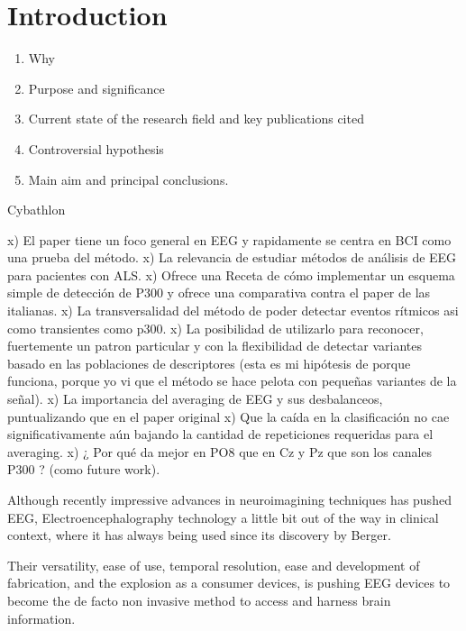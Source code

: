 \documentclass[entropy,article,submit,moreauthors,pdftex,10pt,a4paper]{mdpi}
\begin{document}

\setcounter{section}{-1} %

\section{Introduction}

\begin{enumerate}[leftmargin=*,labelsep=3mm]
\item	Why
\item	Purpose and significance
\item	Current state of the research field and key publications cited
\item   Controversial hypothesis
\item   Main aim and principal conclusions.
\end{enumerate}

Cybathlon


x) El paper tiene un foco general en EEG y rapidamente se centra en BCI como una prueba del método.
x) La relevancia de estudiar métodos de análisis de EEG para pacientes con ALS.
x) Ofrece una Receta de cómo implementar un esquema simple de detección de P300 y ofrece una comparativa contra el paper de las italianas.
x) La transversalidad del método de poder detectar eventos rítmicos asi como transientes como p300.
x) La posibilidad de utilizarlo para reconocer, fuertemente un patron particular y con la flexibilidad de detectar variantes basado en las poblaciones de descriptores (esta es mi hipótesis de porque funciona, porque yo vi que el método se hace pelota con pequeñas variantes de la señal).
x) La importancia del averaging de EEG y sus desbalanceos, puntualizando que en el paper original
x) Que la caída en la clasificación no cae significativamente aún bajando la cantidad de repeticiones requeridas para el averaging.
x) ¿ Por qué da mejor en PO8 que en Cz y Pz que son los canales P300 ?  (como future work).


Although recently impressive advances in neuroimagining techniques has pushed EEG, Electroencephalography technology a little bit out of the way in clinical context, where it has always being used since its discovery by Berger.

Their versatility, ease of use, temporal resolution, ease and development of fabrication, and the explosion as a consumer devices, is pushing EEG devices to become the de facto non invasive method to access and harness brain information.
\end{document}
